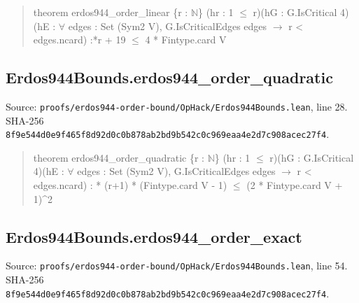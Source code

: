 \documentclass[11pt,a4paper]{article}
\begin{document}
\begin{quote}\small\ttfamily theorem erdos944\_order\_linear \{r : \ensuremath{\mathbb{N}}\} (hr : 1 \ensuremath{\leq} r)\newline (hG : G.IsCritical 4)\newline (hE : \ensuremath{\forall} edges : Set (Sym2 V), G.IsCriticalEdges edges \ensuremath{\to} r < edges.ncard) :*r + 19 \ensuremath{\leq} 4 * Fintype.card V\end{quote}
\subsection{Erdos944Bounds.erdos944\_order\_quadratic}
Source: \texttt{proofs/erdos944-order-bound/OpHack/Erdos944Bounds.lean}, line 28. SHA-256 \texttt{8f9e544d0e9f465f8d92d0c0b878ab2bd9b542c0c969eaa4e2d7c908acec27f4}.

\begin{quote}\small\ttfamily theorem erdos944\_order\_quadratic \{r : \ensuremath{\mathbb{N}}\} (hr : 1 \ensuremath{\leq} r)\newline (hG : G.IsCritical 4)\newline (hE : \ensuremath{\forall} edges : Set (Sym2 V), G.IsCriticalEdges edges \ensuremath{\to} r < edges.ncard) : * (r+1) * (Fintype.card V - 1) \ensuremath{\leq} (2 * Fintype.card V + 1)\textasciicircum{}2\end{quote}
\subsection{Erdos944Bounds.erdos944\_order\_exact}
Source: \texttt{proofs/erdos944-order-bound/OpHack/Erdos944Bounds.lean}, line 54. SHA-256 \texttt{8f9e544d0e9f465f8d92d0c0b878ab2bd9b542c0c969eaa4e2d7c908acec27f4}.
\end{document}

